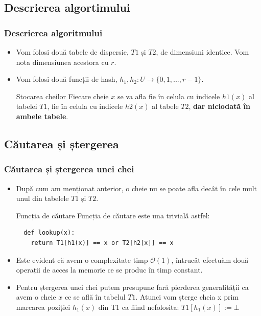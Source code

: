 \documentclass{beamer}
\begin{document}
\begin{frame}
\section{Descrierea algortimului}
\frametitle{Descrierea algoritmului}
\begin{itemize}
\item Vom folosi două tabele de dispersie, $T1$ și $T2$, de dimensiuni identice. Vom nota dimensiunea acestora cu $r$.
\item Vom folosi două funcții de hash, $h_1, h_2: U \to \{0, 1, ..., r-1\}$.
\begin{block}{Stocarea cheilor}
Fiecare cheie $x$ se va afla fie în celula cu indicele $h1(x)$ al tabelei $T1$, fie în celula cu indicele $h2(x)$ al tabele $T2$, \textbf{dar niciodată în ambele tabele}.
\end{block}
\end{itemize}

\end{frame}
\begin{frame}[fragile]
\subsection{Căutarea și ștergerea}
\frametitle{Căutarea și ștergerea unei chei}
\begin{itemize}
\item După cum am menționat anterior, o cheie nu se poate afla decât în cele mult unul din tabelele $T1$ și $T2$.
\begin{block}{Funcția de căutare}
Funcția de căutare este una trivială astfel:
\begin{lstlisting}
  def lookup(x):
   	return T1[h1(x)] == x or T2[h2[x]] == x
\end{lstlisting}
\end{block}
\item Este evident că avem o complexitate timp $\mathcal{O}(1)$, întrucât efectuăm două operații de acces la memorie ce se produc în timp constant.
\item Pentru ștergerea unei chei putem presupune fară pierderea generalității ca avem o cheie $x$ ce se află în tabelul $T1$. Atunci vom șterge cheia x prim marcarea poziției $h_1(x)$ din T1 ca fiind nefolosita: $T1[h_1(x)] := \bot$
\end{itemize}

\end{frame}
\end{document}
